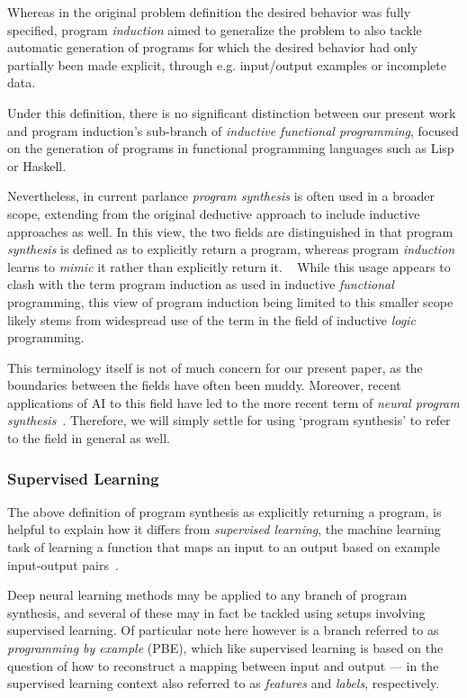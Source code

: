 \documentclass{article}
\begin{document}
Whereas in the original problem definition the desired behavior was fully specified, program \emph{induction} aimed to generalize the problem to also tackle automatic generation of programs for which the desired behavior had only partially been made explicit, through e.g. input/output examples or incomplete data.

Under this definition, there is no significant distinction between our present work and program induction's sub-branch of \emph{inductive functional programming}, focused on the generation of programs in functional programming languages such as Lisp~\citep{lisp} or Haskell.

Nevertheless, in current parlance \emph{program synthesis} is often used in a broader scope, extending from the original deductive approach to include inductive approaches as well.
In this view, the two fields are distinguished in that program \emph{synthesis} is defined as to explicitly return a program,
whereas program \emph{induction} learns to \emph{mimic} it rather than explicitly return it.%
~\citep{devlin2017robustfill,gulwani2017program,nps}
While this usage appears to clash with the term program induction as used in inductive \emph{functional} programming,
this view of program induction being limited to this smaller scope likely stems from widespread use of the term in the field of inductive \emph{logic} programming.

This terminology itself is not of much concern for our present paper, as the boundaries between the fields have often been muddy.
Moreover, recent applications of AI to this field have led to the more recent term of \emph{neural program synthesis}~\citep{nps}. Therefore, we will simply settle for using `program synthesis' to refer to the field in general as well.

\subsubsection{Supervised Learning}

The above definition of program synthesis as explicitly returning a program,
is helpful to explain how it differs from \emph{supervised learning},
the machine learning task of learning a function that maps an input to an output based on example input-output pairs~\citep{russell2002artificial}.

Deep neural learning methods may be applied to any branch of program synthesis,
and several of these may in fact be tackled using setups involving supervised learning.
Of particular note here however is a branch referred to as \emph{programming by example} (PBE),
which like supervised learning is based on the question of how to reconstruct a mapping between input and output --- in the supervised learning context also referred to as \emph{features} and \emph{labels}, respectively.
\end{document}
